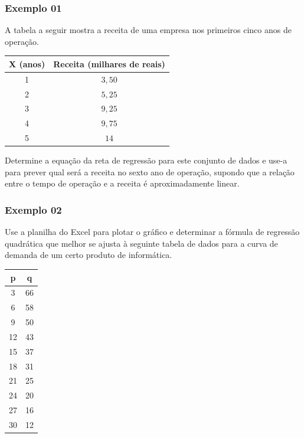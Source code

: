 \documentclass[hyperref={pdfpagelabels=false}]{beamer}
\begin{document}
\begin{frame}
\frametitle{Exemplo 01}
A tabela a seguir mostra a receita de uma empresa nos primeiros cinco anos de operação.

\begin{table}
	\centering
	\begin{tabular}{|c|c|}
		\hline
		X (anos)	&	Receita (milhares de reais) \\
		\hline
		1			&	$3,50$	\\
		\hline
		2			&	$5,25$	\\
		\hline
		3			&	$9,25$	\\
		\hline
		4			&	$9,75$	\\
		\hline
		5			&	$14$	\\
		\hline		
	\end{tabular}
\end{table}

Determine a equação da reta de regressão para este conjunto de dados e use-a para prever qual será a receita no sexto ano de operação, supondo que a relação entre o tempo de operação e a receita é aproximadamente linear.

\end{frame}

\begin{frame}
\frametitle{Exemplo 02}

Use a planilha do Excel para plotar o gráfico e determinar a fórmula de regressão quadrática que melhor se ajusta à seguinte tabela de dados para a curva de demanda de um certo produto de informática.

\begin{table}
	\centering
	\begin{tabular}{|c|c|}
		\hline
		p	&	q	\\
		\hline
		3	&	66	\\
		\hline
		6	&	58	\\
		\hline
		9	&	50	\\
		\hline
		12	&	43	\\
		\hline
		15	&	37	\\
		\hline
		18	&	31	\\
		\hline
		21	&	25	\\
		\hline
		24	&	20	\\
		\hline
		27	&	16	\\
		\hline
		30	&	12	\\
		\hline
	\end{tabular}
\end{table}

\end{frame}
\end{document}
